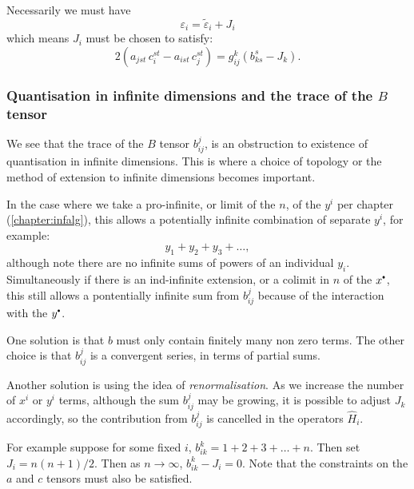     Necessarily we must have
    \[ \varepsilon_i = \widetilde{\varepsilon}_i + J_i\]
    which means \(J_i\) must be chosen to satisfy:
    \[2 \left( a_{jst} \, c_i^{st} - a_{ist} \, c_j^{st} \right) = g_{ij}^k ( b_{k s }^{s} - J_k).\]
    
    \subsubsection{Quantisation in infinite dimensions and the trace of the \texorpdfstring{\(B\)}{B} tensor}
    
    We see that the trace of the \(B\) tensor \(b_{ij}^{j}\), is an obstruction to existence of quantisation in infinite dimensions. This is where a choice of topology or the method of extension to infinite dimensions becomes important.
    
    In the case where we take a pro-infinite, or limit of the \(n\), of the \(y^i\) per chapter (\ref{chapter:infalg}),
    this allows a potentially infinite combination of separate \(y^i\), for example:
    \[ y_1 + y_2 + y_3 + \dots, \]
    although note there are no infinite sums of powers of an individual \(y_i\). Simultaneously if there is an ind-infinite extension, or a colimit in \(n\) of the \(x^{\sbt}\), this still allows a pontentially infinite sum from \(b_{ij}^j\) because of the interaction with the \(y^{\sbt}\). 
    
    One solution is that \(b\) must only contain finitely many non zero terms. The other choice is that \(b_{ij}^j\) is a convergent series, in terms of partial sums. 
    
    Another solution is using the idea of  \emph{renormalisation}. As we increase the number of \(x^i\) or \(y^i\) terms, although the sum \(b_{ij}^{j}\) may be growing, it is possible to adjust \(J_k\) accordingly, so the contribution from \(b_{ij}^j \) is cancelled in the operators \(\widehat{H}_i\).
    
    \begin{ex}
    For example suppose for some fixed \(i\), \(b_{ik}^k = 1 + 2 + 3 + \dots + n \). Then set \(J_{i} = n(n+1)/2\). Then as \(n \rightarrow \infty\), \( b_{ik}^k - J_{i} = 0\). Note that the constraints on the \(a\) and \(c\) tensors must also be satisfied.
    \end{ex}
    
